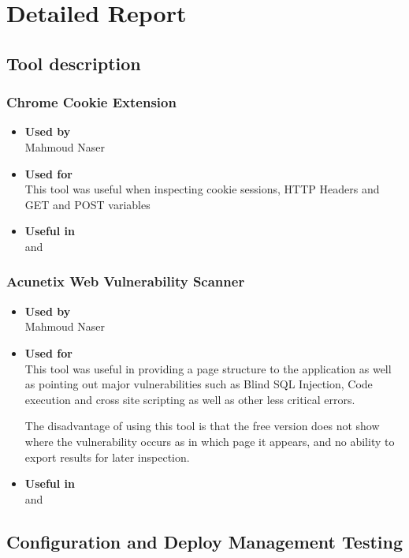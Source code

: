 \chapter{Detailed Report}\label{chapter:detailed_report}

\section{Tool description}
\subsection*{Chrome Cookie Extension}
\begin{itemize}
	\item \textbf{Used by}\\ Mahmoud Naser
	\item \textbf{Used for}\\ This tool was useful when inspecting cookie sessions, HTTP Headers and GET and POST variables
	\item \textbf{Useful in}\\  and 
\end{itemize}

\subsection*{Acunetix Web Vulnerability Scanner}
\begin{itemize}
	\item \textbf{Used by}\\ Mahmoud Naser
	\item \textbf{Used for}\\ This tool was useful in providing a page structure to the application as well as pointing out major vulnerabilities such as Blind SQL Injection, Code execution and cross site scripting as well as other less critical errors.
	
	The disadvantage of using this tool is that the free version does not show where the vulnerability occurs as in which page it appears, and no ability to export results for later inspection.
	\item \textbf{Useful in}\\  and 
\end{itemize}


\clearpage
\section{Configuration and Deploy Management Testing}


